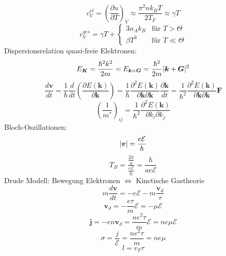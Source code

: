\documentclass[11pt]{article}
\DeclarePairedDelimiter\abs{\lvert}{\rvert}
\begin{document}
\begin{equation}
  c_V^{el}=\left(\frac{\partial u}{\partial T}\right)_V\approx\frac{\pi^2nk_BT}{2T_F}
  \approx\gamma T
\end{equation}
\begin{equation}
  c_V^{ges}=\gamma T + \begin{cases}
  3n_Ak_B & \text{für } T>\Theta \\
  \beta T^3 & \text{für } T\ll\Theta
  \end{cases}
\end{equation}
Dispersionsrelation quasi-freie Elektronen:
\begin{equation}
  E_{\bm{K}}=\frac{\hbar^2k^2}{2m}=E_{\bm{k}+\bm{G}}=\frac{\hbar^2}{2m}
  \abs{\bm{k}+\bm{G}}^2
\end{equation}
\begin{equation}
  \frac{d\bm{v}}{dt}=\frac{1}{\hbar}\frac{d}{dt}\left(\frac{\partial E(\bm{k})}
  {\partial\bm{k}}\right)=\frac{1}{\hbar}\frac{\partial^2E(\bm{k})}
  {\partial\bm{k}\partial\bm{k}}\frac{\partial\bm{k}}{dt}=
  \frac{1}{\hbar^2}\frac{\partial^2E(\bm{k})}
  {\partial\bm{k}\partial\bm{k}}\bm{F}
\end{equation}
\begin{equation}
  \left(\frac{1}{m^*}\right)_{ij}=\frac{1}{\hbar^2}\frac{\partial^2E(\bm{k})}
  {\partial k_i\partial k_j}
\end{equation}
Bloch-Oszillationen:
\begin{equation}
  \abs{\bm{v}}=\frac{e\mathcal{E}}{\hbar}
\end{equation}
\begin{equation}
  T_B=\frac{\frac{2\pi}{a}}{\frac{e\mathcal{E}}{\hbar}}=\frac{h}{ae\mathcal{E}}
\end{equation}
Drude Modell: Bewegung Elektronen $\iff$ Kinetische Gastheorie
\begin{equation}
  m\frac{d\bm{v}}{dt}=-e\mathcal{E}-m\frac{\bm{v}_d}{\tau}
\end{equation}
\begin{equation}
  \bm{v}_d=-\frac{e\tau}{m}\bm{\mathcal{E}}=-\mu\bm{\mathcal{E}}
\end{equation}
\begin{equation}
  \bm{j}=-en\bm{v}_d=\frac{ne^2\tau}{m}\bm{\mathcal{E}}=ne\mu\bm{\mathcal{E}}
\end{equation}
\begin{equation}
  \sigma=\frac{j}{\mathcal{E}}=\frac{ne^2\tau}{m}=ne\mu
\end{equation}
\begin{equation}
  l=v_F\tau
\end{equation}
\end{document}
